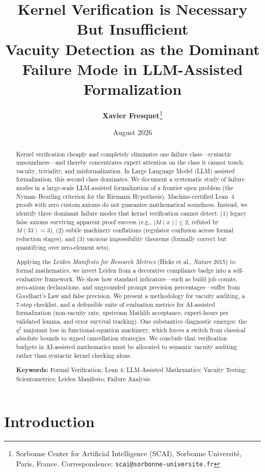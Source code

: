\documentclass[11pt,a4paper]{article}
\title{\textbf{Kernel Verification is Necessary But Insufficient}\\[0.5em]
\large Vacuity Detection as the Dominant Failure Mode in LLM-Assisted Formalization}
\author{\textbf{Xavier Fresquet}\thanks{Sorbonne Center for Artificial Intelligence (SCAI), Sorbonne Universit\'e, Paris, France. Correspondence: \texttt{scai@sorbonne-universite.fr}}}
\date{August 2026}
\theoremstyle{definition}
\theoremstyle{remark}
\begin{document}
\maketitle

\begin{abstract}
Kernel verification cheaply and completely eliminates one failure class---syntactic unsoundness---and thereby concentrates expert attention on the class it cannot touch: vacuity, triviality, and misformalization. In Large Language Model (LLM) assisted formalization, this second class dominates. We document a systematic study of failure modes in a large-scale LLM-assisted formalization of a frontier open problem (the Nyman--Beurling criterion for the Riemann Hypothesis). Machine-certified Lean~4 proofs with zero custom axioms do not guarantee mathematical soundness. Instead, we identify three dominant failure modes that kernel verification cannot detect: (1) legacy false axioms surviving apparent proof success (e.g., $|M(x)| \le 2$, refuted by $M(33)=3$), (2) subtle machinery conflations (regulator confusion across formal reduction stages), and (3) vacuous impossibility theorems (formally correct but quantifying over zero-element sets).

Applying the \emph{Leiden Manifesto for Research Metrics} (Hicks et al., \emph{Nature} 2015) to formal mathematics, we invert Leiden from a decorative compliance badge into a self-evaluative framework. We show how standard indicators---such as build job counts, zero-axiom declarations, and ungrounded prompt precision percentages---suffer from Goodhart's Law and false precision. We present a methodology for vacuity auditing, a 7-step checklist, and a defensible suite of evaluation metrics for AI-assisted formalization (non-vacuity rate, upstream Mathlib acceptance, expert-hours per validated lemma, and error survival tracking). One substantive diagnostic emerges: the $q^2$ majorant loss in functional-equation machinery, which forces a switch from classical absolute bounds to signed cancellation strategies. We conclude that verification budgets in AI-assisted mathematics must be allocated to semantic vacuity auditing rather than syntactic kernel checking alone.

\textbf{Keywords:} Formal Verification; Lean 4; LLM-Assisted Mathematics; Vacuity Testing; Scientometrics; Leiden Manifesto; Failure Analysis.
\end{abstract}

\section{Introduction}
\label{sec:intro}
\end{document}
